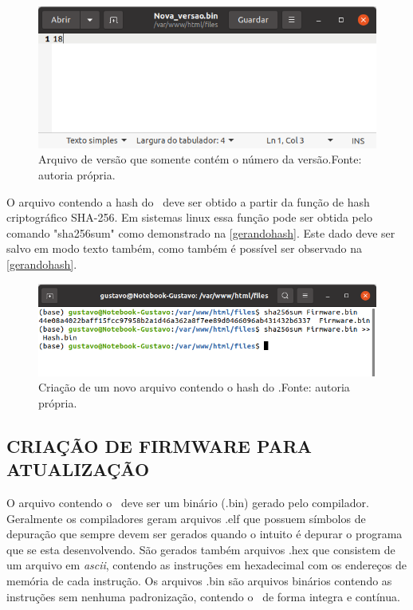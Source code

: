 \begin{figure}[H]
    \scriptsize
     \centering
     \includegraphics[scale=0.9]{dados/figuras/arquivodeversao.png}
     \caption{Arquivo de versão que somente contém o número da versão.\newline Fonte: autoria própria.}
     \label{arquivoversao}
\end{figure}

O arquivo contendo a hash do \firmware\ deve ser obtido a partir da função de hash criptográfico SHA-256. Em sistemas linux essa função pode ser obtida pelo comando "sha256sum" como demonstrado na \autoref{gerandohash}. Este dado deve ser salvo em modo texto também, como também é possível ser observado na \autoref{gerandohash}.

\begin{figure}[H]
    \scriptsize
     \centering
     \includegraphics[scale=0.8]{dados/figuras/hashcreate.png}
     \caption{Criação de um novo arquivo contendo o hash do \firmware.\newline Fonte: autoria própria.}
     \label{gerandohash}
\end{figure}
\subsection{CRIAÇÃO DE FIRMWARE PARA ATUALIZAÇÃO}
O arquivo contendo o \firmware\ deve ser um binário (.bin) gerado pelo compilador. Geralmente os compiladores geram arquivos .elf que possuem símbolos de depuração que sempre devem ser gerados quando o intuito é depurar o programa que se esta desenvolvendo. São gerados também arquivos .hex que consistem de um arquivo em \textit{ascii}, contendo as instruções em hexadecimal com os endereços de memória de cada instrução. Os arquivos .bin são arquivos binários contendo as instruções sem nenhuma padronização, contendo o \firmware\ de forma integra e contínua.

